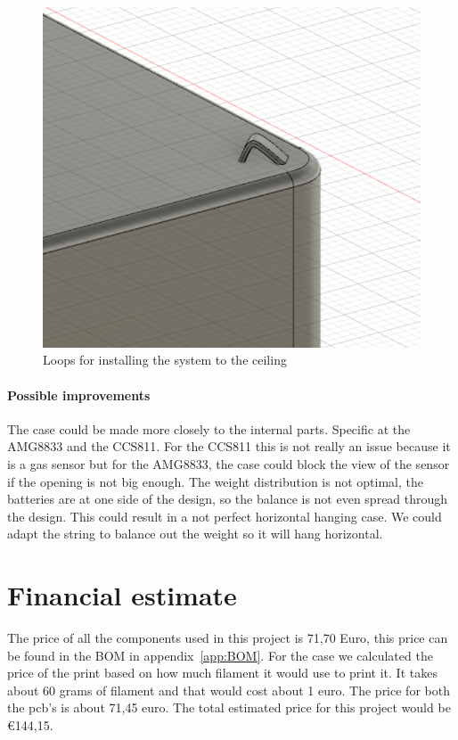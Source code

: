 \documentclass[11pt,a4paper]{article}
\begin{document}
\begin{figure}[H]
	\centering
	\includegraphics[width=1.0\linewidth]{loops_hang_system.png}
	\caption{Loops for installing the system to the ceiling}
	\label{fig:loops_hang_system}
\end{figure}
\paragraph{Possible improvements}
The case could be made more closely to the internal parts. Specific at the AMG8833 and the CCS811. For the CCS811 this is not  really an issue because it is a gas sensor but for the AMG8833, the case could block the view of the sensor if the opening is not big enough. The weight distribution is not optimal, the batteries are at one side of the design, so the balance is not even spread through the design. This could result in a not perfect horizontal hanging case. We could adapt the string to balance out the weight so it will hang horizontal.


\section{Financial estimate}
The price of all the components used in this project is 71,70 Euro, this price can be found in the BOM in appendix~\ref{app:BOM}.
For the case we calculated the price of the print based on how much filament it would use to print it. It takes about 60 grams of filament and that would cost about 1 euro.
The price for both the pcb's is about 71,45 euro. The total estimated price for this project would be \euro 144,15. 
\end{document}
